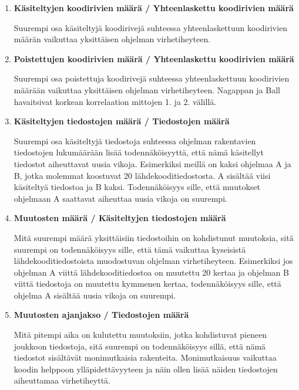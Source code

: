 \documentclass[finnish]{../tktltiki2}
\theoremstyle{definition}
\theoremstyle{remark}
\begin{document}
\begin{enumerate}
    
    \item {\bf Käsiteltyjen koodirivien määrä / Yhteenlaskettu koodirivien määrä}
    
    Suurempi osa käsiteltyjä koodirivejä suhteessa yhteenlaskettuun koodirivien määrän vaikuttaa yksittäisen ohjelman 
    virhetiheyteen.
    
    \newpage
    
    \item {\bf Poistettujen koodirivien määrä / Yhteenlaskettu koodirivien määrä}
    
    Suurempi osa poistettuja koodirivejä suhteessa yhteenlaskettuun koodirivien määrään vaikuttaa yksittäisen ohjelman 
    virhetiheyteen. Nagappan ja Ball havaitsivat korkean korrelaation mittojen 1. ja 2. välillä.
    
    \item {\bf Käsiteltyjen tiedostojen määrä / Tiedostojen määrä}
    
    Suurempi osa käsiteltyjä tiedostoja suhteessa ohjelman rakentavien tiedostojen lukumäärään lisää todennäköisyyttä, 
    että nämä käsitellyt tiedostot aiheuttavat uusia vikoja. Esimerkiksi meillä on kaksi ohjelmaa A ja B, jotka molemmat 
    koostuvat 20 lähdekooditiedostosta. A sisältää viisi käsiteltyä tiedostoa ja B kaksi. Todennäköisyys sille, että 
    muutokset ohjelmaan A saattavat aiheuttaa uusia vikoja on suurempi.
    
    \item {\bf Muutosten määrä / Käsiteltyjen tiedostojen määrä}
    
    Mitä suurempi määrä yksittäisiin tiedostoihin on kohdistunut muutoksia, sitä suurempi on todennäköisyys sille, että 
    tämä vaikuttaa kyseisistä lähdekooditiedostoista muodostuvan ohjelman virhetiheyteen. Esimerkiksi jos ohjelman A 
    viittä lähdekooditiedostoa on muutettu 20 kertaa ja ohjelman B viittä tiedostoja on muutettu kymmenen kertaa, 
    todennäköisyys sille, että ohjelma A sisältää uusia vikoja on suurempi.

    \item {\bf Muutosten ajanjakso / Tiedostojen määrä}
    
    Mitä pitempi aika on kulutettu muutoksiin, jotka kohdistuvat pieneen joukkoon tiedostoja, sitä suurempi on 
    todennäköisyys sillä, että nämä tiedostot sisältävät monimutkaisia rakenteita. Monimutkaisuus vaikuttaa koodin 
    helppoon ylläpidettävyyteen ja näin ollen lisää näiden tiedostojen aiheuttamaa virhetiheyttä.


\end{enumerate}
\end{document}
